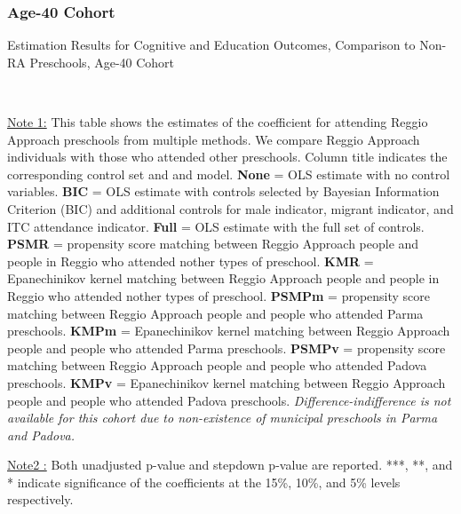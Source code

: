 \subsubsection{Age-40 Cohort}
\begin{table}[H] \caption{Estimation Results for Cognitive and Education Outcomes, Comparison to Non-RA Preschools, Age-40 Cohort} \label{ols-CN-adult40-reg-other}
\scalebox{0.6}{}
\vspace{1ex} \\
\footnotesize\raggedright{\underline{Note 1:} This table shows the estimates of the coefficient for attending Reggio Approach preschools from multiple methods. We compare Reggio Approach individuals with those who attended other preschools. Column title indicates the corresponding control set and and model. \textbf{None} = OLS estimate with no control variables. \textbf{BIC} = OLS estimate with controls selected by Bayesian Information Criterion (BIC) and additional controls for male indicator, migrant indicator, and ITC attendance indicator. \textbf{Full} = OLS estimate with the full set of controls. \textbf{PSMR} =  propensity score matching between Reggio Approach people and people in Reggio who attended nother types of preschool. \textbf{KMR} = Epanechinikov kernel matching between Reggio Approach people and people in Reggio who attended nother types of preschool. \textbf{PSMPm} = propensity score matching between Reggio Approach people and people who attended Parma preschools. \textbf{KMPm} = Epanechinikov kernel matching between Reggio Approach people and people who attended Parma preschools. \textbf{PSMPv} = propensity score matching between Reggio Approach people and people who attended Padova preschools. \textbf{KMPv} = Epanechinikov kernel matching between Reggio Approach people and people who attended Padova preschools. \textit{Difference-indifference is not available for this cohort due to non-existence of municipal preschools in Parma and Padova.}}

\footnotesize\raggedright{\underline{Note2 :} Both unadjusted p-value and stepdown p-value are reported. ***, **, and * indicate significance of the coefficients at the 15\%, 10\%, and 5\% levels respectively.}
\end{table}


